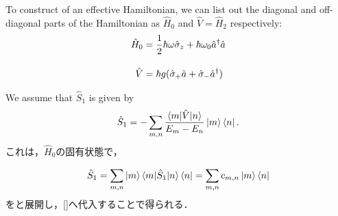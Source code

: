 To construct of an effective Hamiltonian, we can list out the diagonal and off-diagonal parts of the Hamiltonian as $\hat{H}_0$ and $\hat{V}=\hat{H}_2$ respectively:
\begin{align}
    \hat{H}_0&=\frac{1}{2}\hbar\omega{\hat{\sigma}}_z
    +\hbar\omega_0\hat{a}^\dagger{\hat{a}}\\[10pt]
    \hat{V}&=\hbar g({\hat{\sigma}}_+\hat{a}+{\hat{\sigma}}_-\hat{a}^\dagger)
\end{align}

We assume that $\hat{S}_{1}$ is given by
\begin{equation}
    \hat{S}_{1}=-\sum_{m,n}\frac{\braket{m|\hat{V}|n}}{E_{m}-E_{n}}\ket{m}\bra{n}.
\end{equation}
これは，$\hat{H}_0$の固有状態で，

\begin{equation}
    \hat{S}_1 = \sum_{m,n}\ket{m}\braket{m|\hat{S}_1|n}\bra{n}
    =\sum_{m,n}c_{m,n}\ket{m}\bra{n}
\end{equation}をと展開し，\eqref{}へ代入することで得られる．

